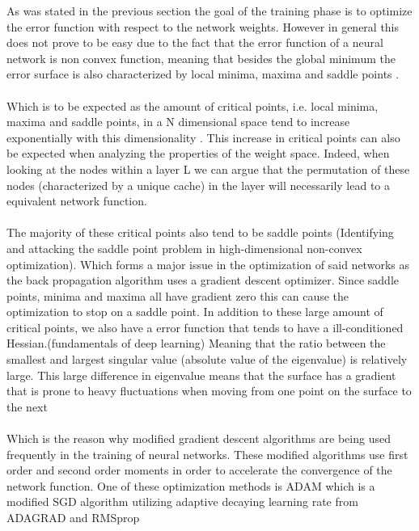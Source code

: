 \documentclass[12pt]{article}
\begin{document}
As was stated in the previous section the goal of the training phase is to optimize the error function with respect to the network weights. However in general this does not prove to be easy due to the fact that the error function of a neural network is non convex function, meaning that besides the global minimum the error surface is also characterized by local minima, maxima and saddle points \cite{Dauphin2014}.
\\
\\
Which is to be expected as the amount of critical points, i.e. local minima, maxima and saddle points, in a N dimensional space tend to increase exponentially with this dimensionality \cite{Dauphin2014}. This increase in critical points can also be expected when analyzing the properties of the weight space. Indeed, when looking at the nodes within a layer L we can argue that the permutation of these nodes (characterized by a unique cache) in the layer will necessarily lead to a equivalent network function.\cite{Bishop2013}\cite{Badrinarayanan2015} 
\\
\\
The majority of these critical points also tend to be saddle points (Identifying and attacking the saddle point problem in high-dimensional non-convex optimization). Which forms a major issue in the optimization of said networks as the back propagation algorithm uses a gradient descent optimizer. Since saddle points, minima and maxima all have gradient zero this can cause the optimization to stop on a saddle point. In addition to these large amount of critical points, we also have a error function that tends to have a ill-conditioned Hessian.(fundamentals of deep learning) Meaning that the ratio between the smallest and largest singular value (absolute value of the eigenvalue) is relatively large. This large difference in eigenvalue means that the surface has a gradient that is prone to heavy fluctuations when moving from one point on the surface to the next \cite{Budumu} 
\\
\\ 
Which is the reason why modified gradient descent algorithms are being used frequently in the training of neural networks\cite{Xu2017}. These modified algorithms use first order and second order moments in order to accelerate the convergence of the network function. One of these optimization methods is ADAM\cite{Kingma2014} which is a modified SGD algorithm utilizing adaptive decaying learning rate from ADAGRAD and RMSprop
\\
\\
\end{document}
